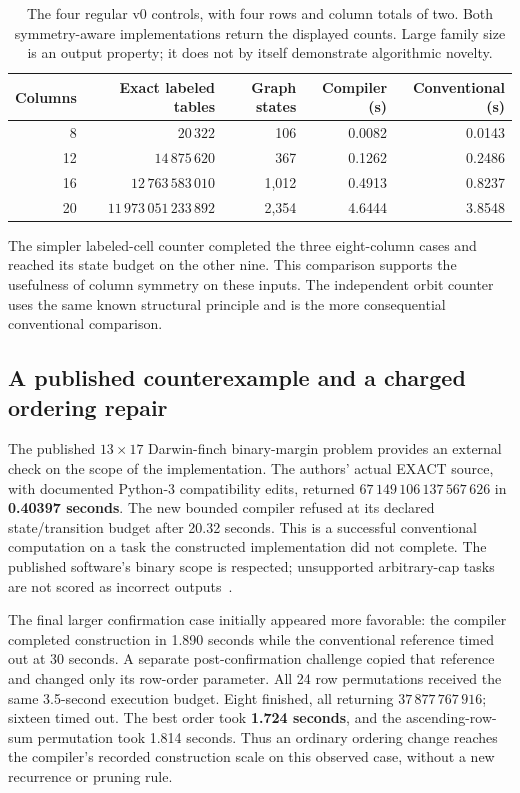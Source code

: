 \begin{table}[H]
\centering\small
\begin{tabular}{@{}rrrrr@{}}
\toprule
Columns & Exact labeled tables & Graph states & Compiler (s) & Conventional (s)\\
\midrule
8 & $20\,322$ & 106 & 0.0082 & 0.0143\\
12 & $14\,875\,620$ & 367 & 0.1262 & 0.2486\\
16 & $12\,763\,583\,010$ & 1,012 & 0.4913 & 0.8237\\
20 & $11\,973\,051\,233\,892$ & 2,354 & 4.6444 & 3.8548\\
\bottomrule
\end{tabular}
\caption{The four regular v0 controls, with four rows and column totals of two.
Both symmetry-aware implementations return the displayed counts. Large family size
is an output property; it does not by itself demonstrate algorithmic novelty.}
\label{tab:scientific-regular}
\end{table}

The simpler labeled-cell counter completed the three eight-column cases and reached
its state budget on the other nine. This comparison supports the usefulness of
column symmetry on these inputs. The independent orbit counter uses the same known
structural principle and is the more consequential conventional comparison.

\subsection{A published counterexample and a charged ordering repair}

The published $13\times17$ Darwin-finch binary-margin problem provides an external
check on the scope of the implementation. The authors' actual EXACT source, with
documented Python-3 compatibility edits, returned
\(67\,149\,106\,137\,567\,626\) in \textbf{0.40397 seconds}.
The new bounded compiler refused at its declared state/transition budget after
20.32 seconds. This is a successful conventional computation on a task
the constructed implementation did not complete. The published software's binary
scope is respected; unsupported arbitrary-cap tasks are not scored as incorrect
outputs~\cite{miller,exact}.

The final larger confirmation case initially appeared more favorable: the compiler
completed construction in 1.890 seconds while the conventional reference
timed out at 30 seconds. A separate post-confirmation challenge copied that reference
and changed only its row-order parameter. All 24 row permutations received the same
3.5-second execution budget. Eight finished, all returning
\(37\,877\,767\,916\); sixteen timed out. The best order took
\textbf{1.724 seconds}, and the ascending-row-sum permutation took 1.814 seconds.
Thus an ordinary ordering change reaches the compiler's recorded construction scale
on this observed case, without a new recurrence or pruning rule.


